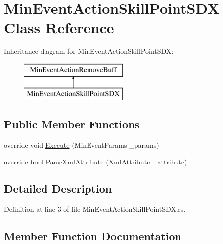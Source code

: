 \hypertarget{class_min_event_action_skill_point_s_d_x}{}\section{Min\+Event\+Action\+Skill\+Point\+S\+DX Class Reference}
\label{class_min_event_action_skill_point_s_d_x}
Inheritance diagram for Min\+Event\+Action\+Skill\+Point\+S\+DX\+:\begin{figure}[H]
\begin{center}
\leavevmode
\includegraphics[height=2.000000cm]{d0/ddb/class_min_event_action_skill_point_s_d_x}
\end{center}
\end{figure}
\subsection*{Public Member Functions}
\begin{DoxyCompactItemize}
\item 
override void \mbox{\hyperlink{class_min_event_action_skill_point_s_d_x_a501b0827ae3847f1c88b03a5554cc8cb}{Execute}} (Min\+Event\+Params \+\_\+params)
\item 
override bool \mbox{\hyperlink{class_min_event_action_skill_point_s_d_x_a8122846c4ccf722aed8022dfa650bab2}{Parse\+Xml\+Attribute}} (Xml\+Attribute \+\_\+attribute)
\end{DoxyCompactItemize}


\subsection{Detailed Description}


Definition at line 3 of file Min\+Event\+Action\+Skill\+Point\+S\+D\+X.\+cs.



\subsection{Member Function Documentation}
\mbox{\label{class_min_event_action_skill_point_s_d_x_a501b0827ae3847f1c88b03a5554cc8cb}} 
